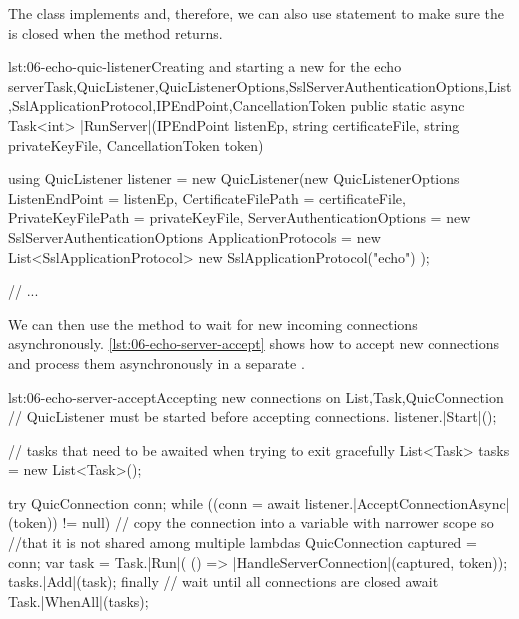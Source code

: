 The \QuicListener{} class implements  and, therefore, we can also use
 statement to make sure the \QuicListener{} is closed when the method returns.

\begin{myListingCsharp}{lst:06-echo-quic-listener}{Creating and starting a new \QuicListener{} for the echo server}{Task,QuicListener,QuicListenerOptions,SslServerAuthenticationOptions,List,SslApplicationProtocol,IPEndPoint,CancellationToken}{}
public static async Task<int> |RunServer|(IPEndPoint listenEp,
    string certificateFile, string privateKeyFile, CancellationToken token)
{
    using QuicListener listener = new QuicListener(new QuicListenerOptions
    {
        ListenEndPoint = listenEp,
        CertificateFilePath = certificateFile,
        PrivateKeyFilePath = privateKeyFile,
        ServerAuthenticationOptions = new SslServerAuthenticationOptions
        {
            ApplicationProtocols = new List<SslApplicationProtocol>
            {
                new SslApplicationProtocol("echo")
            }
        }
    });

    // ...
}
\end{myListingCsharp}

We can then use the  method to wait for new incoming connections
asynchronously. \autoref{lst:06-echo-server-accept} shows how to accept new connections and process
them asynchronously in a separate .

\begin{myListingCsharp}{lst:06-echo-server-accept}{Accepting new connections on \QuicListener{}}{List,Task,QuicConnection}{}
    // QuicListener must be started before accepting connections.
    listener.|Start|();

    // tasks that need to be awaited when trying to exit gracefully
    List<Task> tasks = new List<Task>();

    try
    {
        QuicConnection conn;
        while ((conn = await listener.|AcceptConnectionAsync|(token)) != null)
        {
            // copy the connection into a variable with narrower scope so
            //that it is not shared among multiple lambdas
            QuicConnection captured = conn;
            var task = Task.|Run|(
                () => |HandleServerConnection|(captured, token));
            tasks.|Add|(task);
        }
    }
    finally
    {
        // wait until all connections are closed
        await Task.|WhenAll|(tasks);
    }
\end{myListingCsharp}

